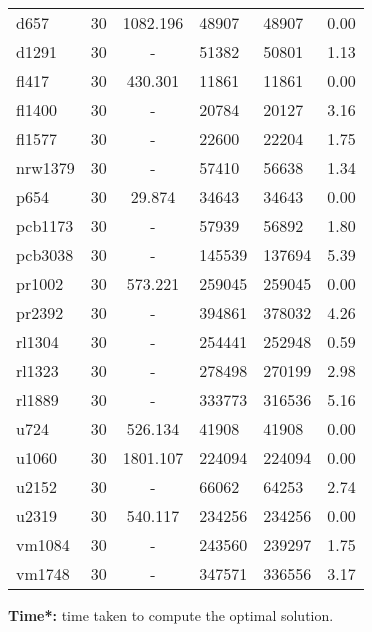 \begin{center}
\begin{longtable}{lccllr}
			d657 & 30 & 1082.196 & 48907 & 48907 & 0.00 \\
			d1291 & 30 & - & 51382 & 50801 & 1.13  \\
			fl417 & 30 & 430.301 & 11861 & 11861 & 0.00\\
			fl1400 & 30 & - & 20784 & 20127 &  3.16 \\
			fl1577 & 30 & - & 22600 & 22204 &  1.75\\
			nrw1379 & 30 & - & 57410 & 56638 & 1.34 \\
			p654 & 30 & 29.874 & 34643 & 34643 & 0.00 \\
			pcb1173 & 30 & - & 57939 & 56892 & 1.80  \\
			pcb3038 & 30 & - & 145539 & 137694 & 5.39  \\
			pr1002 & 30 & 573.221 & 259045 & 259045 & 0.00  \\
			pr2392 & 30 & - & 394861 & 378032 & 4.26 \\
			rl1304 & 30 & - &254441 & 252948 & 0.59  \\
			rl1323 & 30  & - & 278498 & 270199 &  2.98 \\
			rl1889 & 30 & - & 333773 & 316536 & 5.16 \\
			u724 & 30 & 526.134 & 41908 & 41908 & 0.00 \\
			u1060 & 30 & 1801.107 & 224094 & 224094 & 0.00  \\
			u2152 & 30 & - & 66062 & 64253 & 2.74 \\
			u2319 & 30 & 540.117 & 234256 & 234256 & 0.00 \\
			vm1084 & 30 & - & 243560 & 239297 & 1.75  \\
			vm1748 & 30 & - &347571 & 336556 & 3.17 \\

\end{longtable}
\textbf{Time*:} time taken to compute the optimal solution.
\end{center}



